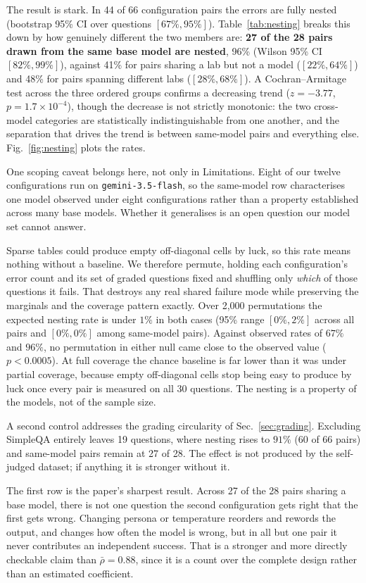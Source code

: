 \documentclass[conference]{IEEEtran}
\begin{document}
The result is stark. In 44 of 66 configuration pairs the errors are
fully nested (bootstrap 95\% CI over questions $[67\%, 95\%]$).
Table~\ref{tab:nesting} breaks this down by how genuinely different the two
members are: \textbf{27 of the 28 pairs drawn from the same base model are
nested}, 96\% (Wilson 95\% CI $[82\%, 99\%]$), against 41\% for pairs sharing
a lab but not a model ($[22\%, 64\%]$) and 48\% for pairs spanning different
labs ($[28\%, 68\%]$). A Cochran--Armitage test across the three ordered
groups confirms a decreasing trend ($z=-3.77$, $p=1.7\times10^{-4}$), though
the decrease is not strictly monotonic: the two cross-model categories are
statistically indistinguishable from one another, and the separation that
drives the trend is between same-model pairs and everything else.
Fig.~\ref{fig:nesting} plots the rates.

One scoping caveat belongs here, not only in Limitations. Eight of our
twelve configurations run on \texttt{gemini-3.5-flash}, so the same-model
row characterises one model observed under eight configurations rather than
a property established across many base models. Whether it generalises is an
open question our model set cannot answer.

Sparse tables could produce empty off-diagonal cells by luck, so this rate
means nothing without a baseline. We therefore permute, holding each
configuration's error count and its set of graded questions fixed and
shuffling only \emph{which} of those questions it fails. That destroys any
real shared failure mode while preserving the marginals and the coverage
pattern exactly. Over 2{,}000 permutations the expected nesting rate is under
$1\%$ in both cases (95\% range $[0\%, 2\%]$ across all pairs and
$[0\%, 0\%]$ among same-model pairs). Against observed rates of $67\%$ and
$96\%$, no permutation in either null came close to the observed value
($p<0.0005$). At full coverage the chance baseline is far lower than it was
under partial coverage, because empty off-diagonal cells stop being easy to
produce by luck once every pair is measured on all 30 questions. The nesting
is a property of the models, not of the sample size.

A second control addresses the grading circularity of
Sec.~\ref{sec:grading}. Excluding SimpleQA entirely leaves 19 questions,
where nesting rises to $91\%$ (60 of 66 pairs) and same-model pairs remain at
27 of 28. The effect is not produced by the self-judged dataset; if anything
it is stronger without it.

The first row is the paper's sharpest result. Across 27 of the 28 pairs
sharing a base model, there is not one question the second configuration
gets right that the first gets wrong. Changing persona or temperature
reorders and rewords the output, and changes how often the model is wrong,
but in all but one pair it never contributes an independent success. That is
a stronger and more directly checkable claim than $\bar\rho=0.88$, since it
is a count over the complete design rather than an estimated coefficient.
\end{document}
